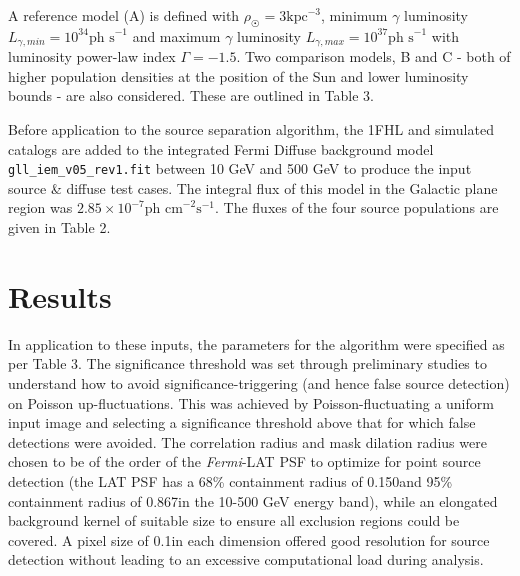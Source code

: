 \documentclass{PoS}
\begin{document}
A reference model (A) is defined with $\rho_{\astrosun} = 3 \text{kpc}^{-3}$, minimum $\gamma$ luminosity $L_{\gamma, min} = 10^{34} \text{ph s}^{-1}$ and maximum $\gamma$ luminosity $L_{\gamma, max} = 10^{37} \text{ph s}^{-1}$ with luminosity power-law index $\Gamma=-1.5$. Two comparison models, B and C - both of higher population densities at the position of the Sun and lower luminosity bounds - are also considered. These are outlined in Table 3.

\begin{table}
\centering
{}
\caption{Parameters for 10 - 500 GeV Galaxy Population Simulations.}
\end{table}

Before application to the source separation algorithm, the 1FHL and simulated catalogs are added to the integrated Fermi Diffuse background model \verb|gll_iem_v05_rev1.fit| between 10 GeV and 500 GeV to produce the input source \& diffuse test cases. The integral flux of this model in the Galactic plane region was $2.85 \times 10^{-7} \text{ph cm}^{-2}\text{s}^{-1}$. The fluxes of the four source populations are given in Table 2.

\section{Results}

In application to these inputs, the parameters for the algorithm were specified as per Table 3. The significance threshold was set through preliminary studies to understand how to avoid significance-triggering (and hence false source detection) on Poisson up-fluctuations. This was achieved by Poisson-fluctuating a uniform input image and selecting a significance threshold above that for which false detections were avoided. The correlation radius and mask dilation radius were chosen to be of the order of the \textit{Fermi}-LAT PSF to optimize for point source detection (the LAT PSF has a 68\% containment radius of 0.150\degree and 95\% containment radius of 0.867\degree in the 10-500 GeV energy band), while an elongated background kernel of suitable size to ensure all exclusion regions could be covered. A pixel size of 0.1\degree in each dimension offered good resolution for source detection without leading to an excessive computational load during analysis.
\end{document}
